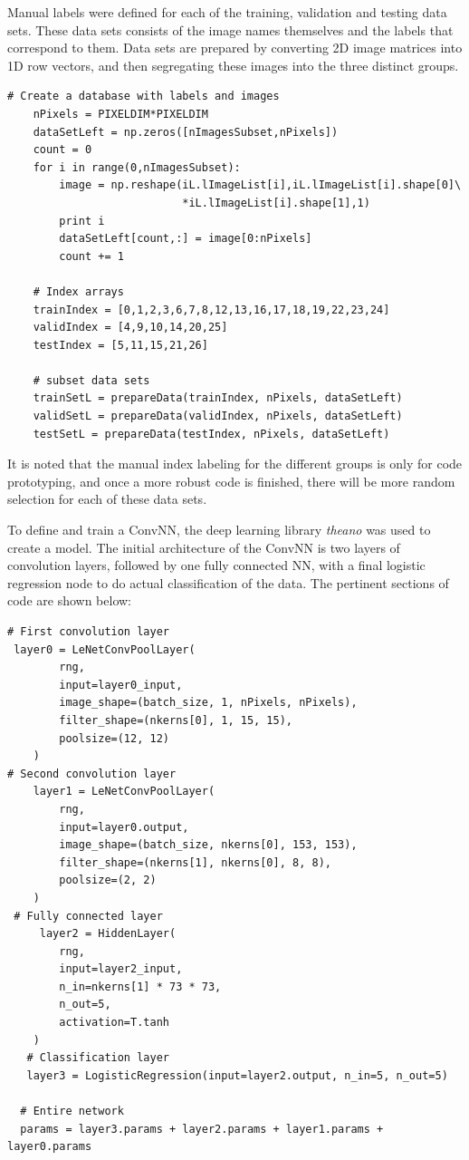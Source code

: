 \documentclass[letterpaper,12pt]{article}
\begin{document}
Manual labels were defined for each of the training, validation and testing data sets.  These data sets consists of the image names themselves and the labels that correspond to them. Data sets are prepared by converting 2D image matrices into 1D row vectors, and then segregating these images into the three distinct groups.

\begin{verbatim}
# Create a database with labels and images
    nPixels = PIXELDIM*PIXELDIM
    dataSetLeft = np.zeros([nImagesSubset,nPixels])
    count = 0 
    for i in range(0,nImagesSubset):
        image = np.reshape(iL.lImageList[i],iL.lImageList[i].shape[0]\
                           *iL.lImageList[i].shape[1],1)
        print i
        dataSetLeft[count,:] = image[0:nPixels]
        count += 1
        
    # Index arrays
    trainIndex = [0,1,2,3,6,7,8,12,13,16,17,18,19,22,23,24]
    validIndex = [4,9,10,14,20,25]
    testIndex = [5,11,15,21,26]
    
    # subset data sets
    trainSetL = prepareData(trainIndex, nPixels, dataSetLeft)
    validSetL = prepareData(validIndex, nPixels, dataSetLeft)
    testSetL = prepareData(testIndex, nPixels, dataSetLeft)
\end{verbatim}
It is noted that the manual index labeling for the different groups is only for code prototyping, and once a more robust code is finished, there will be more random selection for each of these data sets.

To define and train a ConvNN, the deep learning library \textit{theano} was used to create a model. The initial architecture of the ConvNN is two layers of convolution layers, followed by one fully connected NN, with a final logistic regression node to do actual classification of the data. The pertinent sections of code are shown below:

\begin{verbatim}
# First convolution layer
 layer0 = LeNetConvPoolLayer(
        rng,
        input=layer0_input,
        image_shape=(batch_size, 1, nPixels, nPixels),
        filter_shape=(nkerns[0], 1, 15, 15),
        poolsize=(12, 12)
    )
# Second convolution layer
    layer1 = LeNetConvPoolLayer(
        rng,
        input=layer0.output,
        image_shape=(batch_size, nkerns[0], 153, 153),
        filter_shape=(nkerns[1], nkerns[0], 8, 8),
        poolsize=(2, 2)
    )
 # Fully connected layer
     layer2 = HiddenLayer(
        rng,
        input=layer2_input,
        n_in=nkerns[1] * 73 * 73,
        n_out=5,
        activation=T.tanh
    )
   # Classification layer
   layer3 = LogisticRegression(input=layer2.output, n_in=5, n_out=5)
   
  # Entire network 
  params = layer3.params + layer2.params + layer1.params + layer0.params
\end{verbatim}
\end{document}
